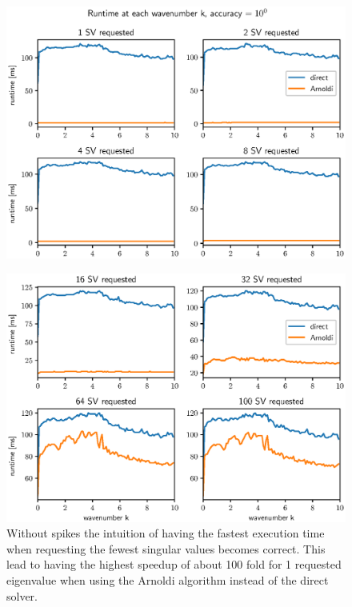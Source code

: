 \documentclass[a4paper, oneside]{discothesis}
\begin{document}
\begin{figure} [H]
	\centering
	\includegraphics[width=0.9\columnwidth]{figures/arnoldi_time_1e2_1.eps}
	\label{fig:arnoldi_time_1e2_1}
\end{figure}
\begin{figure} [H]
	\centering
	\includegraphics[width=0.9\columnwidth]{figures/arnoldi_time_1e2_2.eps}
	\caption{
		Without spikes the intuition of having the fastest execution time when requesting the fewest singular values becomes correct.
		This lead to having the highest speedup of about 100 fold for 1 requested eigenvalue when using the Arnoldi algorithm instead of the direct solver.
	}
	\label{fig:arnoldi_time_1e2_2}
\end{figure}
\end{document}
